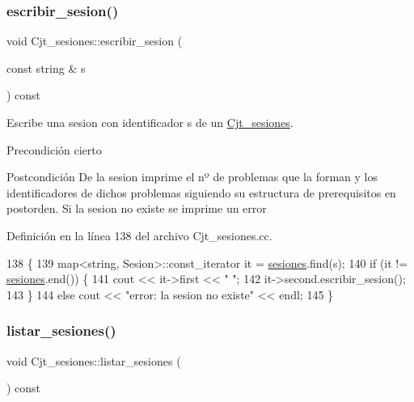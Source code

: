 \subsubsection{\texorpdfstring{escribir\+\_\+sesion()}{escribir\_sesion()}}
{\footnotesize\ttfamily void Cjt\+\_\+sesiones\+::escribir\+\_\+sesion (\begin{DoxyParamCaption}\item[{const string \&}]{s }\end{DoxyParamCaption}) const}



Escribe una sesion con identificador s de un \mbox{\hyperlink{class_cjt__sesiones}{Cjt\+\_\+sesiones}}. 

\begin{DoxyPrecond}{Precondición}
cierto 
\end{DoxyPrecond}
\begin{DoxyPostcond}{Postcondición}
De la sesion imprime el nº de problemas que la forman y los identificadores de dichos problemas siguiendo su estructura de prerequisitos en postorden. Si la sesion no existe se imprime un error 
\end{DoxyPostcond}


Definición en la línea 138 del archivo Cjt\+\_\+sesiones.\+cc.


\begin{DoxyCode}
138                                                             \{
139       map<string, Sesion>::const\_iterator it = \mbox{\hyperlink{class_cjt__sesiones_a87e835a62e561eeb0f93eedbdcbe1802}{sesiones}}.find(s);
140       \textcolor{keywordflow}{if} (it != \mbox{\hyperlink{class_cjt__sesiones_a87e835a62e561eeb0f93eedbdcbe1802}{sesiones}}.end()) \{
141         cout << it->first << \textcolor{stringliteral}{" "};
142         it->second.escribir\_sesion();
143       \}
144       \textcolor{keywordflow}{else} cout << \textcolor{stringliteral}{"error: la sesion no existe"} << endl;
145     \}
\end{DoxyCode}
\mbox{\label{class_cjt__sesiones_a58e65694f1e4b544ae3c3e85cf329eeb}} 
\subsubsection{\texorpdfstring{listar\+\_\+sesiones()}{listar\_sesiones()}}
{\footnotesize\ttfamily void Cjt\+\_\+sesiones\+::listar\+\_\+sesiones (\begin{DoxyParamCaption}{ }\end{DoxyParamCaption}) const}



